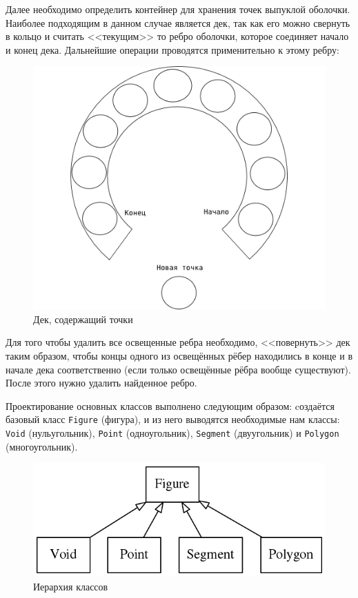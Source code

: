 Далее необходимо определить контейнер для хранения точек выпуклой оболочки.
 Наиболее подходящим в данном случае является дек, так как его можно свернуть
  в кольцо и считать <<текущим>> то ребро оболочки, которое соединяет начало и конец дека.
   Дальнейшие операции проводятся применительно к этому ребру:

\begin{figure}[ht!]
\begin{center}
\includegraphics[width=0.6\hsize]{images/conv_6}
\end{center}
\caption{Дек, содержащий точки}\label{fig:conv_6}
\end{figure}
 Для того чтобы удалить все освещенные ребра необходимо, <<повернуть>> дек таким образом,
  чтобы концы одного из освещённых рёбер находились в конце и в начале дека соответственно
  (если только освещённые рёбра вообще существуют). После этого нужно удалить найденное ребро.


Проектирование основных классов выполнено следующим образом:
 cоздаётся базовый класс \verb|Figure| (фигура), и из него выводятся необходимые
  нам классы: \verb|Void| (нульугольник), \verb|Point| (одноугольник),
   \verb|Segment| (двуугольник) и \verb|Polygon| (многоугольник).

\begin{figure}[ht!]
\begin{center}
\includegraphics[width=0.7\hsize]{images/conv_7}
\end{center}
\caption{Иерархия классов}\label{fig:conv_7}
\end{figure}

